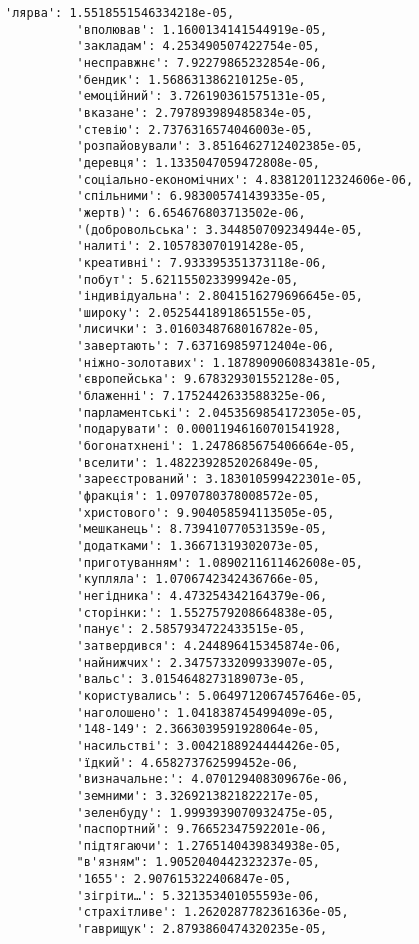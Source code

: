 \documentclass[11pt]{article}
\begin{document}
\begin{Verbatim}[commandchars=\\\{\}]
          'лярва': 1.5518551546334218e-05,
          'вполював': 1.1600134141544919e-05,
          'закладам': 4.253490507422754e-05,
          'несправжнє': 7.92279865232854e-06,
          'бендик': 1.568631386210125e-05,
          'емоційний': 3.726190361575131e-05,
          'вказане': 2.797893989485834e-05,
          'стевію': 2.7376316574046003e-05,
          'розпайовували': 3.8516462712402385e-05,
          'деревця': 1.1335047059472808e-05,
          'соціально-економічних': 4.838120112324606e-06,
          'спільними': 6.983005741439335e-05,
          'жертв)': 6.654676803713502e-06,
          '(добровольська': 3.344850709234944e-05,
          'налиті': 2.105783070191428e-05,
          'креативні': 7.933395351373118e-06,
          'побут': 5.621155023399942e-05,
          'індивідуальна': 2.8041516279696645e-05,
          'широку': 2.0525441891865155e-05,
          'лисички': 3.0160348768016782e-05,
          'завертають': 7.637169859712404e-06,
          'ніжно-золотавих': 1.1878909060834381e-05,
          'європейська': 9.678329301552128e-05,
          'блаженні': 7.1752442633588325e-06,
          'парламентські': 2.0453569854172305e-05,
          'подарувати': 0.00011946160701541928,
          'богонатхнені': 1.2478685675406664e-05,
          'вселити': 1.4822392852026849e-05,
          'зареєстрований': 3.183010599422301e-05,
          'фракція': 1.0970780378008572e-05,
          'христового': 9.904058594113505e-05,
          'мешканець': 8.739410770531359e-05,
          'додатками': 1.36671319302073e-05,
          'приготуванням': 1.0890211611462608e-05,
          'купляла': 1.0706742342436766e-05,
          'негідника': 4.473254342164379e-06,
          'сторінки:': 1.5527579208664838e-05,
          'панує': 2.5857934722433515e-05,
          'затвердився': 4.244896415345874e-06,
          'найнижчих': 2.3475733209933907e-05,
          'вальс': 3.0154648273189073e-05,
          'користувались': 5.0649712067457646e-05,
          'наголошено': 1.041838745499409e-05,
          '148-149': 2.3663039591928064e-05,
          'насильстві': 3.0042188924444426e-05,
          'їдкий': 4.658273762599452e-06,
          'визначальне:': 4.070129408309676e-06,
          'земними': 3.3269213821822217e-05,
          'зеленбуду': 1.9993939070932475e-05,
          'паспортний': 9.76652347592201e-06,
          'підтягаючи': 1.2765140439834938e-05,
          "в'язням": 1.9052040442323237e-05,
          '1655': 2.907615322406847e-05,
          'зігріти…': 5.321353401055593e-06,
          'страхітливе': 1.2620287782361636e-05,
          'гаврищук': 2.8793860474320235e-05,

\end{Verbatim}
\end{document}
